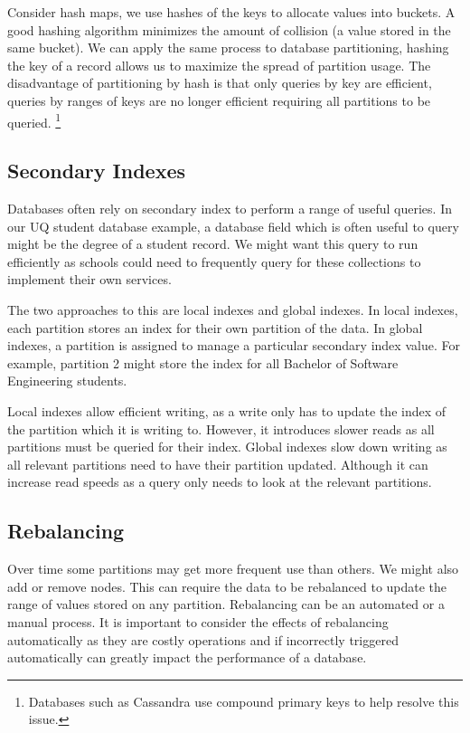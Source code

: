 Consider hash maps,
we use hashes of the keys to allocate values into buckets.
A good hashing algorithm minimizes the amount of collision (a value stored in the same bucket).
We can apply the same process to database partitioning,
hashing the key of a record allows us to maximize the spread of partition usage.
The disadvantage of partitioning by hash is that only queries by key are efficient,
queries by ranges of keys are no longer efficient requiring all partitions to be queried.%
\footnote{Databases such as Cassandra use compound primary keys to help resolve this issue.}

\subsection*{Secondary Indexes}

Databases often rely on secondary index to perform a range of useful queries.
In our UQ student database example,
a database field which is often useful to query might be the degree of a student record.
We might want this query to run efficiently as schools could need to frequently query for these collections to implement their own services.

The two approaches to this are local indexes and global indexes.
In local indexes,
each partition stores an index for their own partition of the data.
In global indexes,
a partition is assigned to manage a particular secondary index value.
For example, partition 2 might store the index for all Bachelor of Software Engineering students.

Local indexes allow efficient writing,
as a write only has to update the index of the partition which it is writing to.
However, it introduces slower reads as all partitions must be queried for their index.
Global indexes slow down writing as all relevant partitions need to have their partition updated.
Although it can increase read speeds as a query only needs to look at the relevant partitions.

\subsection{Rebalancing}

Over time some partitions may get more frequent use than others.
We might also add or remove nodes.
This can require the data to be rebalanced to update the range of values stored on any partition.
Rebalancing can be an automated or a manual process.
It is important to consider the effects of rebalancing automatically as they are costly operations and if incorrectly triggered automatically can greatly impact the performance of a database.

